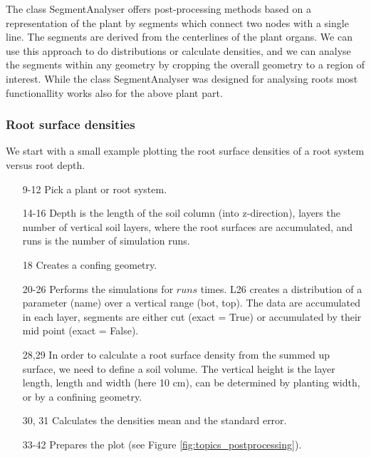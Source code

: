 The class SegmentAnalyser offers post-processing methods based on a representation of the plant by segments which connect two nodes with a single line. The segments are derived from the centerlines of the plant organs. We can use this approach to do distributions or calculate densities, and we can analyse the segments within any geometry by cropping the overall geometry to a region of interest. While the class SegmentAnalyser was designed for analysing roots most functionallity works also for the above plant part. 

\subsubsection*{Root surface densities}

We start with a small example plotting the root surface densities of a root system versus root depth.



\begin{itemize}
\item[9-12] Pick a plant or root system.
\item[14-16] Depth is the length of the soil column (into z-direction), layers the number of vertical soil layers, where the root surfaces are accumulated, and runs is the number of simulation runs. 
\item[18] Creates a confing geometry.
\item[20-26] Performs the simulations for $runs$ times. L26 creates a distribution of a parameter (name) over a vertical range (bot, top). The data are accumulated in each layer, segments are either cut (exact = True) or accumulated by their mid point (exact = False). 
\item[28,29] In order to calculate a root surface density from the summed up surface, we need to define a soil volume. The vertical height is the layer length, length and width (here 10 cm), can be determined by planting width, or by a confining geometry. 
\item[30, 31] Calculates the densities mean and the standard error. 
\item[33-42] Prepares the plot (see Figure \ref{fig:topics_postprocessing}).
\end{itemize}

